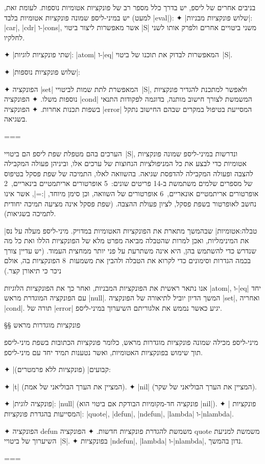 בניבים אחרים של ליספ, יש בדרך כלל מספר רב של פונקציות אטומיות נוספות. לעומת
זאת, יש במיני-ליספ שמונה פונקציות אטומיות בלבד (למעט \E|eval|):
✦ \ע|שלוש פונקציות מבניות|: \E|car|, \E|cdr| ו-\E|cons|, אשר מאפשרות ליצור
ביטוי \E|S| משני ביטויים אחרים ולפרק אותו לשני לחלקיו.

✦ \ע|שתי פונקציות לוגיות|: \E|atom| ו-\E|eq| המאפשרות לבדוק את תוכנו של
ביטוי~\E|S|.

✦ \ע|שלוש פונקציות נוספות|:
\begin{itemize}
    ✦ הפונקציה \E|set| המאפשרת לתת שמות לביטויי~\E|S|, ולאפשר למתכנת להגדיר
      פונקציות נוספות משלו.
      ✦ הפונקציה \E|cond| המשמשת לצורך חישוב מותנה,
      בדוגמה לפקודות התנאי בשפות תכנות אחרות.
      ✦ הפונקציה \E|error| המסייעת בטיפול במקרים שבהם החישוב נתקל בשגיאה.
\end{itemize}
===

הערכים בהם מטפלת שפת ליספ הם ביטויי~\E|S|, ונדרשות במיני-ליספ שמונה פונקציות
אטומיות כדי לבצע את כל המניפולציות הנחוצות של ערכים אלו, וביניהן פעולה המקבילה
להצבה ופעולה המקבילה להדפסת שגיאה. בהשוואה לאלו, התמיכה של שפת פסקל בטיפוס של
מספרים שלמים משתמשת ב-14 פריטים שונים:~5 אופרטורים אריתמטיים בינאריים,~2
אופרטורים אריתמטיים אונאריים,~6 אופרטורים של השוואה, וכן סימן מיוחד, \E|:=|,
אשר אינו נחשב לאופרטור בשפת פסקל, לציון פעולת ההצבה. (שפת פסקל אינה מציעה תמיכה
יחודית לתמיכה בשגיאות).

|טבלה:אטומיות| שבהמשך מתארת את הפונקציות האטומיות במדויק. מיני-ליספ מעלה
על נס את המינימליות, ואכן למרות שהטבלה מביאה מפרט מלא של הפונקציות הללו ואת כל
מה שנדרש כדי להשתמש בהן, היא אינה משתרעת על פני יותר ממחצית העמוד. (יש עדיין
צורך בכמה הגדרות וסימונים כדי לקרוא את הטבלה ולהבין את משמעות~8 הפונקציות בה,
אולם ניכר כי תיאורן קצר.)

אנו נתאר ראשית את הפונקציות המבניות, ואחר כך את הפונקציות הלוגיות \E|atom|,
ו-\E|eq| יחד עם הפונקציה המוגדרת מראש \E|null|. המשך הדיון יוביל לתיאורה של
הפונקציה \E|set|, ואחריה \E|cond|. תורה של \E|error| יגיע כאשר נממש את
אלגוריתם השיערוך במיני-ליספ.

§§ פונקציות מוגדרות מראש

מיני-ליספ מכילה שמונה פונקציות מוגדרות מראש, כלומר פונקציות הכתובות בשפת
מיני-ליספ תוך שימוש בפונקציות האטומיות, ואשר נטענות תמיד יחד עם מיני-ליספ.

✦ \ע|קבועים| (פונקציות ללא פרמטרים):
\begin{itemize}
  ✦ \E|t| (המציין את הערך הבוליאני של אמת).
  ✦ \E|nil| (המציין את הערך הבוליאני של שקר).
\end{itemize}
✦ \ע|פונקציה לוגית|: \E|null| (פונקציה חד-מקומיות הבודקת אם ביטוי הוא \E|nil|).
✦ \ע| פונקציות המסייעות בהגדרת פונקציות|:
\E|quote|, \E|defun|, \E|ndefun|, \E|lambda| ו-\E|nlambda|.
\begin{itemize}
  ✦ הפונקציה defun משמשת להגדרת פונקציות חדשות.
  ✦ הפונקציה quote משמשת למניעת השיערוך של ביטויי~\E|S|.
  ✦ בפונקציות \E|ndefun|, \E|lambda| ו-\E|nlambda|, נדון בהמשך.
\end{itemize}
===


